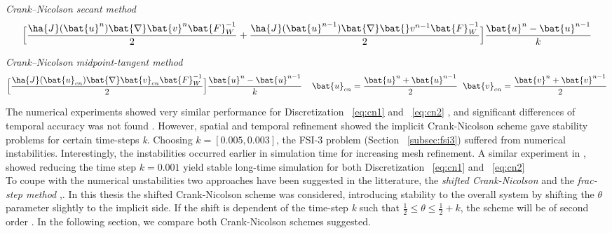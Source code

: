 \begin{discr}
\textit{Crank–Nicolson secant method }
\begin{align*}
\Big[\frac{\ha{J}(\bat{u}^{n}) \bat{\nabla} \bat{v}^{n} \bat{F}_W^{-1}}{2} 
+ \frac{\ha{J}(\bat{u}^{n-1}) \bat{\nabla} \bat{}v^{n-1} \bat{F}_W^{-1}}{2} \Big] 
\frac{\bat{u}^{n} - \bat{u}^{n-1}}{k}
\end{align*} 
\label{eq:cn1}
\end{discr}

\begin{discr}
\textit{Crank–Nicolson midpoint-tangent method}
\begin{align*}
\Big[\frac{\ha{J}(\bat{u}_{cn}) \bat{\nabla} \bat{v}_{cn} \bat{F}_W^{-1}}{2} \Big] 
\frac{\bat{u}^{n} - \bat{u}^{n-1}}{k} \hspace{4mm}
\bat{u}_{cn} = \frac{\bat{u}^{n} + \bat{u}^{n-1}}{2} \hspace{2mm}
\bat{v}_{cn} = \frac{\bat{v}^{n} + \bat{v}^{n-1}}{2}
\end{align*} 
\label{eq:cn2}
\end{discr}

\newpage

The numerical experiments showed very similar performance for Discretization  ~\ref{eq:cn1} and ~\ref{eq:cn2} , and significant differences of temporal accuracy was not found \cite{Richter2015}. However, spatial and temporal refinement showed the implicit Crank-Nicolson scheme gave stability problems for certain time-steps \textit{k}. Choosing $k = [0.005, 0.003]$, the FSI-3 problem (Section  ~\ref{subsec:fsi3}) suffered from numerical instabilities. Interestingly, the instabilities occurred earlier in simulation time for increasing mesh refinement. A similar experiment in  \cite{Wicka}, showed reducing the time step $k = 0.001$  yield stable long-time simulation for both  Discretization  ~\ref{eq:cn1} and ~\ref{eq:cn2}    \\

To coupe with the numerical unstabilities two approaches have been suggested in the litterature,  the \textit{shifted Crank-Nicolson}  and the \textit{frac-step method}  \cite{Richter2015, Wicka, Wick2013a},.  In this thesis the shifted Crank-Nicolson scheme was considered, introducing stability to the overall system by shifting the $\theta$ parameter slightly to the implicit side. If the shift is dependent of the time-step \textit{k} such that $\frac{1}{2} \leq \theta \leq \frac{1}{2} + k$, the scheme will be of second order \cite{Richter2015}. In the following section, we compare both Crank-Nicolson schemes suggested. \\


